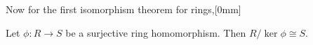 
Now for the first isomorphism theorem for rings,[0mm]
\begin{nthm}
  Let $\phi : R \to S$ be a surjective ring homomorphism. Then $R/\ker\phi \cong S$.
\end{nthm}

